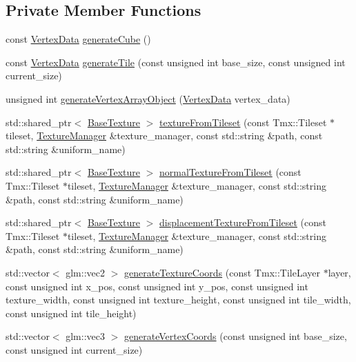 \subsection*{Private Member Functions}
\begin{DoxyCompactItemize}
\item 
const \hyperlink{class_graphics_1_1_vertex_data}{Vertex\+Data} \hyperlink{class_graphics_1_1_renderable_factory_a0688e8bccb6104c68101e14ab39c258e}{generate\+Cube} ()
\item 
const \hyperlink{class_graphics_1_1_vertex_data}{Vertex\+Data} \hyperlink{class_graphics_1_1_renderable_factory_afbf0b634230088f4301505ff49162955}{generate\+Tile} (const unsigned int base\+\_\+size, const unsigned int current\+\_\+size)
\item 
unsigned int \hyperlink{class_graphics_1_1_renderable_factory_a51abec6e45fe118195fbd71530995173}{generate\+Vertex\+Array\+Object} (\hyperlink{class_graphics_1_1_vertex_data}{Vertex\+Data} vertex\+\_\+data)
\item 
std\+::shared\+\_\+ptr$<$ \hyperlink{class_graphics_1_1_base_texture}{Base\+Texture} $>$ \hyperlink{class_graphics_1_1_renderable_factory_a9810a7f53bc6c5823f9183b19413e593}{texture\+From\+Tileset} (const Tmx\+::\+Tileset $\ast$tileset, \hyperlink{class_graphics_1_1_texture_manager}{Texture\+Manager} \&texture\+\_\+manager, const std\+::string \&path, const std\+::string \&uniform\+\_\+name)
\item 
std\+::shared\+\_\+ptr$<$ \hyperlink{class_graphics_1_1_base_texture}{Base\+Texture} $>$ \hyperlink{class_graphics_1_1_renderable_factory_aba39fff9384bb9fabda4c633c71a8ce4}{normal\+Texture\+From\+Tileset} (const Tmx\+::\+Tileset $\ast$tileset, \hyperlink{class_graphics_1_1_texture_manager}{Texture\+Manager} \&texture\+\_\+manager, const std\+::string \&path, const std\+::string \&uniform\+\_\+name)
\item 
std\+::shared\+\_\+ptr$<$ \hyperlink{class_graphics_1_1_base_texture}{Base\+Texture} $>$ \hyperlink{class_graphics_1_1_renderable_factory_aab9ffc72af0ad3d403daabb746865a52}{displacement\+Texture\+From\+Tileset} (const Tmx\+::\+Tileset $\ast$tileset, \hyperlink{class_graphics_1_1_texture_manager}{Texture\+Manager} \&texture\+\_\+manager, const std\+::string \&path, const std\+::string \&uniform\+\_\+name)
\item 
std\+::vector$<$ glm\+::vec2 $>$ \hyperlink{class_graphics_1_1_renderable_factory_ae9ca8626793c8830412112679fb40726}{generate\+Texture\+Coords} (const Tmx\+::\+Tile\+Layer $\ast$layer, const unsigned int x\+\_\+pos, const unsigned int y\+\_\+pos, const unsigned int texture\+\_\+width, const unsigned int texture\+\_\+height, const unsigned int tile\+\_\+width, const unsigned int tile\+\_\+height)
\item 
std\+::vector$<$ glm\+::vec3 $>$ \hyperlink{class_graphics_1_1_renderable_factory_aec007081a7fa5ab143461adecd13ca33}{generate\+Vertex\+Coords} (const unsigned int base\+\_\+size, const unsigned int current\+\_\+size)
\end{DoxyCompactItemize}
